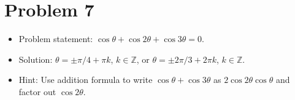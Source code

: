\documentclass{amsart}
\begin{document}
  \section*{Problem 7}

\begin{itemize}
  \item Problem statement: $\cos \theta + \cos 2\theta + \cos 3 \theta = 0$.
  \item Solution: $\theta = \pm \pi/4 + \pi k$, $k \in \mathbb{Z}$, or $\theta = \pm 2\pi/3 + 2\pi k$, $k \in \mathbb{Z}$.
  \item Hint: Use addition formula to write $\cos \theta + \cos 3 \theta$ as $2 \cos 2\theta \cos \theta$ and factor out $\cos 2 \theta$.
    
  \end{itemize}  
\end{document}
